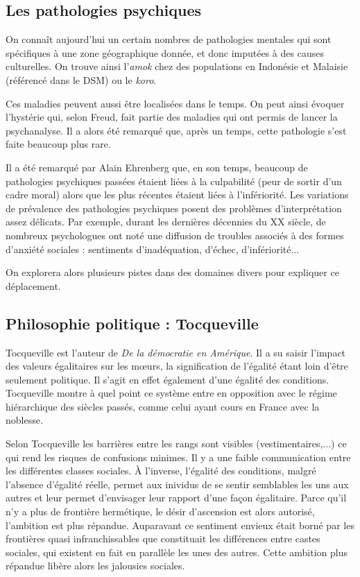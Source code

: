 \subsection{Les pathologies psychiques}

	On connaît aujourd'hui un certain nombres de pathologies mentales qui sont spécifiques à une zone géographique donnée, et donc imputées à des causes culturelles.
	On trouve ainsi l'\textit{amok} chez des populations en Indonésie et Malaisie (référencé dans le DSM) ou le \textit{koro}.

	Ces maladies peuvent aussi être localisées dans le temps.
	On peut ainsi évoquer l'hystérie qui, selon Freud, fait partie des maladies qui ont permis de lancer la psychanalyse.
	Il a alors été remarqué que, après un temps, cette pathologie s'est faite beaucoup plus rare.

	Il a été remarqué par Alain Ehrenberg que, en son temps, beaucoup de pathologies psychiques passées étaient liées à la culpabilité (peur de sortir d'un cadre moral) alors que les plus récentes étaient liées à l'infériorité.
	Les variations de prévalence des pathologies psychiques posent des problèmes d'interprétation assez délicats.
	Par exemple, durant les dernières décennies du XX siècle, de nombreux psychologues ont noté une diffusion de troubles associés à des formes d'anxiété sociales : sentiments d'inadéquation, d'échec, d'infériorité...

	On explorera alors plusieurs pistes dans des domaines divers pour expliquer ce déplacement.

\subsection{Philosophie politique : Tocqueville}

	Tocqueville est l'auteur de \textit{De la démocratie en Amérique}.
	Il a su saisir l'impact des valeurs égalitaires sur les mœurs, la signification de l'égalité étant loin d'être seulement politique.
	Il s'agit en effet également d'une égalité des conditions.
	Tocqueville montre à quel point ce système entre en opposition avec le régime hiérarchique des siècles passés, comme celui ayant cours en France avec la noblesse.

	Selon Tocqueville les barrières entre les rangs sont visibles (vestimentaires,...) ce qui rend les risques de confusions minimes.
	Il y a une faible communication entre les différentes classes sociales.
	À l'inverse, l'égalité des conditions, malgré l'absence d'égalité réelle, permet aux inividus de se sentir semblables les uns aux autres et leur permet d'envisager leur rapport d'une façon égalitaire.
	Parce qu'il n'y a plus de frontière hermétique, le désir d'ascension est alors autorisé, l'ambition est plus répandue.
	Auparavant ce sentiment envieux était borné par les frontières quasi infranchissables que constituait les différences entre castes sociales, qui existent en fait en parallèle les unes des autres.
	Cette ambition plus répandue libère alors les jalousies sociales.

